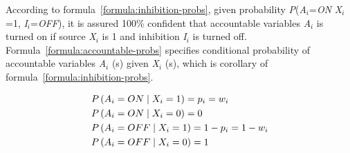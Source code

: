 \documentclass{article}
\numberwithin{equation}{section}
\numberwithin{figure}{section}
\numberwithin{table}{section}
\begin{document}
According to formula~\ref{formula:inhibition-probs}, given probability \textit{P}(\textit{A${}_{i}$}=\textit{ON} {\textbar} \textit{X${}_{i}$}=1, \textit{I${}_{i}$}=\textit{OFF}), it is assured 100\% confident that accountable variables \textit{A${}_{i}$} is turned on if source \textit{X${}_{i}$} is 1 and inhibition \textit{I${}_{i}$} is turned off. Formula~\ref{formula:accountable-probs} specifies conditional probability of accountable variables \textit{A${}_{i}$} (s) given \textit{X${}_{i}$} (s), which is corollary of formula~\ref{formula:inhibition-probs}.

\begin{equation}
\begin{split} 
&P\left(A_i=ON\mathrel{\left|\vphantom{A_i=ON X_i=1}\right.\kern-\nulldelimiterspace}X_i=1\right)=p_i=w_i\\
&P\left(A_i=ON\mathrel{\left|\vphantom{A_i=ON X_i=0}\right.\kern-\nulldelimiterspace}X_i=0\right)=0\\
&P\left(A_i=OFF\mathrel{\left|\vphantom{A_i=OFF X_i=1}\right.\kern-\nulldelimiterspace}X_i=1\right)=1-p_i=1-w_i\\
&P\left(A_i=OFF\mathrel{\left|\vphantom{A_i=OFF X_i=0}\right.\kern-\nulldelimiterspace}X_i=0\right)=1
\end{split}
\label{formula:accountable-probs}
\end{equation}
\end{document}
